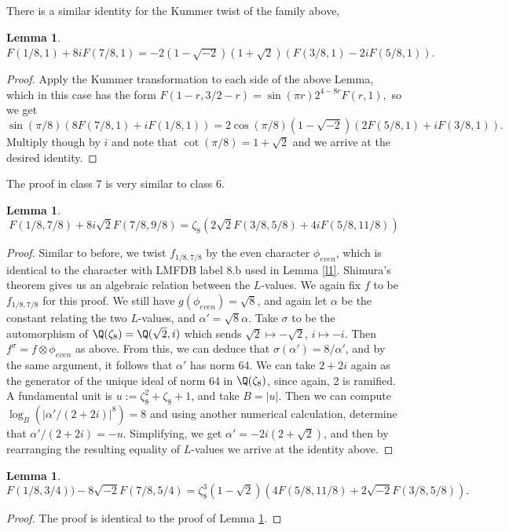 \documentclass[12pt]{amsart}
\newtheorem{Lemma}[theorem]{Lemma}
\theoremstyle{definition}
\theoremstyle{remark}
\begin{document}
There is a similar identity for the Kummer twist of the family above,

\begin{Lemma}\label{l2}
     $F(1/8,1)+8iF(7/8,1)=-2(1 - \sqrt{-2}) (1 + \sqrt{2})(F(3/8, 1) - 2 i F(5/8, 1)).$
\end{Lemma}

\begin{proof}
     Apply the Kummer transformation to each side of the above Lemma, which in this case has the form $F(1-r,3/2-r)=\sin(\pi r)2^{4-8r}F(r,1),$ so we get $$\sin(\pi/8)(8F(7/8,1)+iF(1/8,1))=2\cos(\pi/8)(1-\sqrt{-2})(2F(5/8,1)+iF(3/8,1)).$$ Multiply though by $i$ and note that $\cot(\pi/8)=1+\sqrt{2}$ and we arrive at the desired identity.
\end{proof}

The proof in class 7 is very similar to class 6.

\begin{Lemma}\label{l3}
 $$F(1/8, 7/8) + 8i\sqrt{2} F(7/8, 9/8) = 
 \zeta_8 (2\sqrt{2} F(3/8, 5/8) + 4i F(5/8, 11/8))$$
\end{Lemma}
\begin{proof}
    Similar to before, we twist $f_{1/8,7/8}$ by the even character $\phi_{even}$, which is identical to the character with LMFDB label 8.b used in Lemma \ref{l1}. Shimura's theorem gives us an algebraic relation between the $L$-values.  We again fix $f$ to be $f_{1/8,7/8}$ for this proof. We still have $g(\phi_{even})=\sqrt{8}$, and again let $\alpha$ be the constant relating the two $L$-values, and $\alpha'=\sqrt{8}\alpha$. Take $\sigma$ to be the automorphism of $\Q(\zeta_8)=\Q(\sqrt{2},i)$ which sends $\sqrt{2}\mapsto-\sqrt{2}$, $i\mapsto-i$. Then $f^\sigma=f\otimes \phi_{even}$ as above. From this, we can deduce that $\sigma(\alpha')=8/\alpha'$, and by the same argument, it follows that $\alpha'$ has norm 64. We can take $2+2i$ again as the generator of the unique ideal of norm 64 in $\Q(\zeta_8)$, since again, 2 is ramified. A fundamental unit is $u:=\zeta_8^2+\zeta_8+1$, and take $B=|u|$. Then we can compute $\log_B(|\alpha'/(2+2i)|^8)=8$ and using another numerical calculation, determine that $\alpha'/(2+2i)=-u$. Simplifying, we get $\alpha'=-2 i (2 + \sqrt{2})$, and then by rearranging the resulting equality of $L$-values we arrive at the identity above.\end{proof}

    \begin{Lemma}\label{l4}
 $$F(1/8,3/4))-8\sqrt{-2}F(7/8, 5/4)  = 
\zeta_8^3(1-\sqrt{2}) (4F(5/8, 11/8) + 2\sqrt{-2} F(3/8, 5/8)).$$
\end{Lemma}
\begin{proof}
The proof is identical to the proof of Lemma \ref{l2}.
\end{proof}
\end{document}
